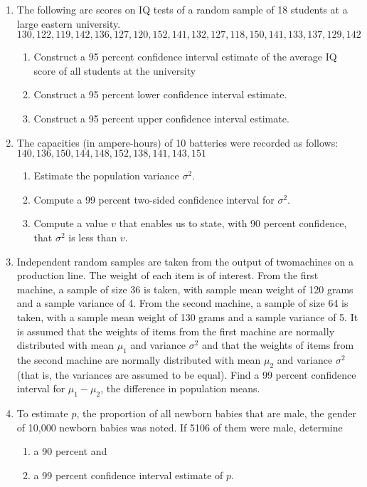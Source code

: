 \documentclass{article}
\begin{document}
\begin{enumerate}
\begin{enumerate}
    \end{enumerate}
    \item  The following are scores on IQ tests of a random sample of 18 students at a large eastern university.
    $130, 122, 119, 142, 136, 127, 120, 152, 141, 132, 127, 118, 150, 141, 133, 137, 129, 142$
    \begin{enumerate}
        \item Construct a 95 percent confidence interval estimate of the average IQ score of all students at the university
        \item Construct a 95 percent lower confidence interval estimate.
        \item Construct a 95 percent upper confidence interval estimate.
    \end{enumerate}
    \item The capacities (in ampere-hours) of 10 batteries were recorded as follows:
    $140, 136, 150, 144, 148, 152, 138, 141, 143, 151$
    \begin{enumerate}
        \item Estimate the population variance $\sigma^2$.
        \item Compute a 99 percent two-sided confidence interval for $\sigma^2$.
        \item Compute a value $v$ that enables us to state, with 90 percent confidence, that $\sigma^2$ is less than $v$.
    \end{enumerate}
    \item Independent random samples are taken from the output of twomachines on a production line. 
    The weight of each item is of interest. From the first machine, a sample of size 36 is taken, with sample mean weight of 120 grams and a sample variance of 4.
    From the second machine, a sample of size 64 is taken, with a sample mean weight of 130 grams and a sample variance of 5.
    It is assumed that the weights of items from the first machine are normally distributed with mean $\mu_1$ and variance $\sigma^2$ and that the weights of items from the second machine are normally distributed with mean $\mu_2$ and variance $\sigma^2$ (that is, the variances are assumed to be equal). 
    Find a 99 percent confidence interval for $\mu_1 - \mu_2$, the difference in population means.
    \item  To estimate $p$, the proportion of all newborn babies that are male, the gender of 10,000 newborn babies was noted. If 5106 of them were male, determine
    \begin{enumerate}
        \item a 90 percent and
        \item a 99 percent confidence interval estimate of $p$.
    \end{enumerate}
\end{enumerate}
\end{document}
